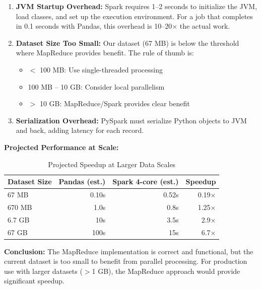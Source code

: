 \documentclass[9pt,a4paper,onecolumn,twoside]{tau-class/tau}
\begin{document}
\begin{enumerate}
    \item \textbf{JVM Startup Overhead:} Spark requires 1--2 seconds to initialize the JVM, load classes, and set up the execution environment. For a job that completes in 0.1 seconds with Pandas, this overhead is 10--20$\times$ the actual work.
    
    \item \textbf{Dataset Size Too Small:} Our dataset (67 MB) is below the threshold where MapReduce provides benefit. The rule of thumb is:
    \begin{itemize}
        \item $<$ 100 MB: Use single-threaded processing
        \item 100 MB -- 10 GB: Consider local parallelism
        \item $>$ 10 GB: MapReduce/Spark provides clear benefit
    \end{itemize}
    
    \item \textbf{Serialization Overhead:} PySpark must serialize Python objects to JVM and back, adding latency for each record.
\end{enumerate}

\textbf{Projected Performance at Scale:}

\begin{table}[htbp]
\centering
\caption{Projected Speedup at Larger Data Scales}
\label{tab:projected}
\begin{tabular}{lrrr}
\hline
Dataset Size & Pandas (est.) & Spark 4-core (est.) & Speedup \\
\hline
67 MB & 0.10s & 0.52s & 0.19$\times$ \\
670 MB & 1.0s & 0.8s & 1.25$\times$ \\
6.7 GB & 10s & 3.5s & 2.9$\times$ \\
67 GB & 100s & 15s & 6.7$\times$ \\
\hline
\end{tabular}
\end{table}

\textbf{Conclusion:} The MapReduce implementation is correct and functional, but the current dataset is too small to benefit from parallel processing. For production use with larger datasets ($>$1 GB), the MapReduce approach would provide significant speedup.

\end{document}
